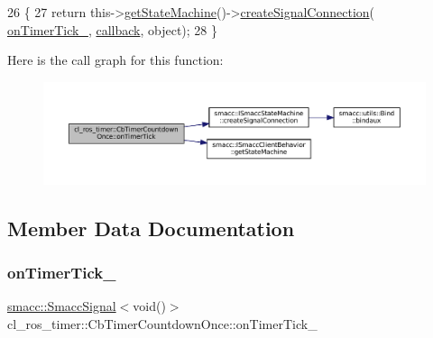 \begin{DoxyCode}
26     \{
27         \textcolor{keywordflow}{return} this->\hyperlink{classsmacc_1_1ISmaccClientBehavior_a9d55a85bf0a920033805a3c050de2019}{getStateMachine}()->\hyperlink{classsmacc_1_1ISmaccStateMachine_adf0f42ade0c65cc471960fe2a7c42da2}{createSignalConnection}(
      \hyperlink{classcl__ros__timer_1_1CbTimerCountdownOnce_ac948b5efd5c9a397319668378463eadd}{onTimerTick\_}, \hyperlink{servers_2opencv__perception__node_2opencv__perception__node_8cpp_a050e697bd654facce10ea3f6549669b3}{callback}, \textcolor{keywordtype}{object});
28     \}
\end{DoxyCode}
Here is the call graph for this function\+:
\nopagebreak
\begin{figure}[H]
\begin{center}
\leavevmode
\includegraphics[width=350pt]{classcl__ros__timer_1_1CbTimerCountdownOnce_a1e20a8c9a9907db8a1d7dacf8c60ad27_cgraph}
\end{center}
\end{figure}


\subsection{Member Data Documentation}
\mbox{\label{classcl__ros__timer_1_1CbTimerCountdownOnce_ac948b5efd5c9a397319668378463eadd}} 
\subsubsection{\texorpdfstring{on\+Timer\+Tick\+\_\+}{onTimerTick\_}}
{\footnotesize\ttfamily \hyperlink{classsmacc_1_1SmaccSignal}{smacc\+::\+Smacc\+Signal}$<$void()$>$ cl\+\_\+ros\+\_\+timer\+::\+Cb\+Timer\+Countdown\+Once\+::on\+Timer\+Tick\+\_\+\hspace{0.3cm}{\ttfamily [private]}}



